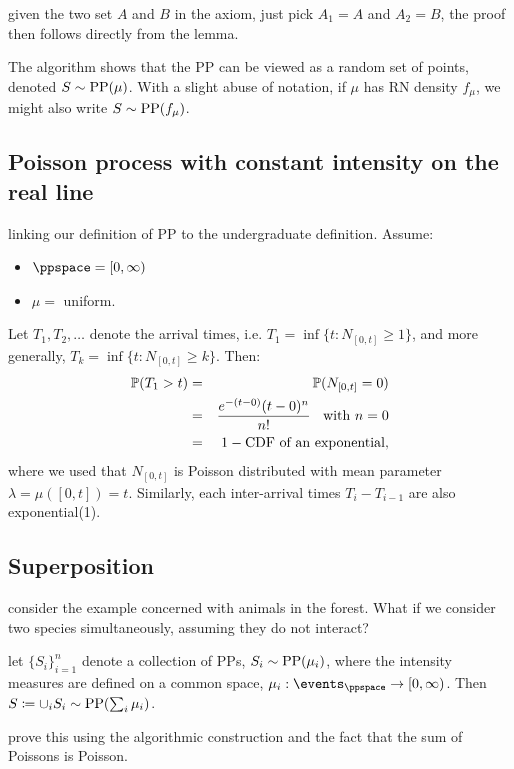 \documentclass{article}
\begin{document}
 given the two set $A$ and $B$ in the axiom, just pick $A_1 = A$ and $A_2 = B$, the proof then follows directly from the lemma.

 The algorithm shows that the PP can be viewed as a random set of points, denoted $S \sim \PP(\mu)$. With a slight abuse of notation, if $\mu$ has RN density $f_\mu$, we might also write $S \sim \PP(f_\mu)$.


\subsection{Poisson process with constant intensity on the real line}

 linking our definition of PP to the undergraduate definition. Assume:
\begin{itemize}
  \item $\ppspace = [0, \infty)$
  \item $\mu =$ uniform.
\end{itemize}
Let $T_1, T_2, \dots$ denote the arrival times, i.e. $T_1 = \inf\{t : N_{[0,t]} \ge 1\}$, and more generally, $T_k = \inf\{t : N_{[0,t]} \ge k\}$.
Then:
\begin{eqnarray}
\P(T_1 > t) &=& \P(N_{[0,t]} = 0) \\
&=& \frac{e^{-(t - 0)} (t-0)^n}{n!} \;\;\text{ with }n=0 \\
&=& 1 - \text{CDF of an exponential},
\end{eqnarray}
where we used that $N_{[0,t]}$ is Poisson distributed with mean parameter 
$\lambda = \mu([0, t]) = t$. 
Similarly, each inter-arrival times $T_i - T_{i-1}$ are also exponential(1).


\subsection{Superposition}

 consider the example concerned with animals in the forest. What if we consider two species simultaneously, assuming they do not interact?

 let $\{S_i\}_{i = 1}^n$ denote a collection of PPs, $S_i \sim \PP(\mu_i)$, where the intensity measures are defined on a common space, $\mu_i : \events_{\ppspace} \to [0, \infty)$. Then $S \defeq \cup_i S_i \sim \PP(\sum_i \mu_i)$.

 prove this using the algorithmic construction and the fact that the sum of Poissons is Poisson. 
\end{document}
